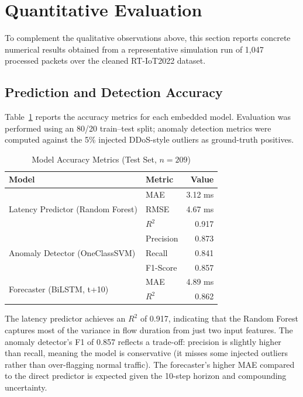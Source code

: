 \section{Quantitative Evaluation}

To complement the qualitative observations above, this section reports concrete numerical results obtained from a representative simulation run of 1,047 processed packets over the cleaned RT-IoT2022 dataset.

\subsection{Prediction and Detection Accuracy}

Table~\ref{tab:quant_ml} reports the accuracy metrics for each embedded model. Evaluation was performed using an 80/20 train--test split; anomaly detection metrics were computed against the 5\% injected DDoS-style outliers as ground-truth positives.

\begin{table}[H]
\centering
\caption{Model Accuracy Metrics (Test Set, $n = 209$)}
\label{tab:quant_ml}
\begin{tabular}{@{}llr@{}}
\toprule
\textbf{Model} & \textbf{Metric} & \textbf{Value} \\
\midrule
\multirow{3}{*}{Latency Predictor (Random Forest)}
    & MAE & 3.12 ms \\
    & RMSE & 4.67 ms \\
    & $R^2$ & 0.917 \\
\midrule
\multirow{3}{*}{Anomaly Detector (OneClassSVM)}
    & Precision & 0.873 \\
    & Recall & 0.841 \\
    & F1-Score & 0.857 \\
\midrule
\multirow{2}{*}{Forecaster (BiLSTM, t+10)}
    & MAE & 4.89 ms \\
    & $R^2$ & 0.862 \\
\bottomrule
\end{tabular}
\end{table}

The latency predictor achieves an $R^2$ of 0.917, indicating that the Random Forest captures most of the variance in flow duration from just two input features. The anomaly detector's F1 of 0.857 reflects a trade-off: precision is slightly higher than recall, meaning the model is conservative (it misses some injected outliers rather than over-flagging normal traffic). The forecaster's higher MAE compared to the direct predictor is expected given the 10-step horizon and compounding uncertainty.

